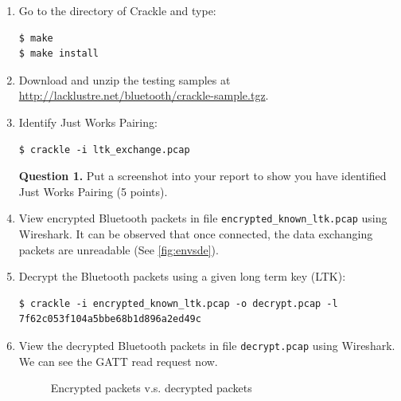 \documentclass[11pt]{article}
\begin{document}
\begin{enumerate}
 
\item Go to the directory of \textsf{Crackle} and type: 
 \begin{lstlisting}
$ make 
$ make install
\end{lstlisting}\vspace{-6mm}

\item Download and unzip the testing samples at \url{http://lacklustre.net/bluetooth/crackle-sample.tgz}.
\item Identify \textsf{Just Works} Pairing:
 \begin{lstlisting}
$ crackle -i ltk_exchange.pcap
\end{lstlisting}\vspace{-6mm}

\textbf{Question 1.} Put a screenshot into your report to show you have identified  \textsf{Just Works} Pairing (5 points). 

\item View encrypted Bluetooth packets in file \texttt{encrypted\_known\_ltk.pcap} using \textsf{Wireshark}. It can be observed that once connected, the data exchanging packets are unreadable (See \autoref{fig:envsde}). 
 
 
\item Decrypt the Bluetooth packets using a given long term key (LTK):
 \begin{lstlisting}
$ crackle -i encrypted_known_ltk.pcap -o decrypt.pcap -l 7f62c053f104a5bbe68b1d896a2ed49c
\end{lstlisting}\vspace{-6mm}

\item View the decrypted Bluetooth packets in file \texttt{decrypt.pcap} using \textsf{Wireshark}. We can see the GATT read request now. 

\begin{figure}[h]
\centering
{}
\caption{\textsf{Encrypted packets v.s. decrypted packets}}\label{fig:envsde}
\end{figure}


\end{enumerate}
\end{document}
